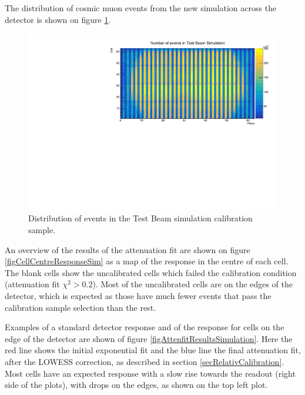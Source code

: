 \documentclass[12pt,a4paper]{article}
\begin{document}
The distribution of cosmic muon events from the new simulation across the detector is shown on figure \ref{figCalibhistSim}.

\begin{figure}[h]
\centering
\includegraphics[width=\textwidth]{Plots/Attenprofs_Simulation_CellPlane.pdf}
\caption{Distribution of events in the Test Beam simulation calibration sample.}
\label{figCalibhistSim}
\end{figure}

An overview of the results of the attenuation fit are shown on figure \ref{figCellCentreResponseSim} as a map of the response in the centre of each cell. The blank cells show the uncalibrated cells which failed the calibration condition (attenuation fit $\chi^2>0.2$). Most of the uncalibrated cells are on the edges of the detector, which is expected as those have much fewer events that pass the calibration sample selection than the rest.

Examples of a standard detector response and of the response for cells on the edge of the detector are shown of figure \ref{figAttenfitResultsSimulation}. Here the red line shows the initial exponential fit and the blue line the final attenuation fit, after the LOWESS correction, as described in section \ref{secRelativCalibration}. Most cells have an expected response with a slow rise towards the readout (right side of the plots), with drops on the edges, as shown on the top left plot.
\end{document}
